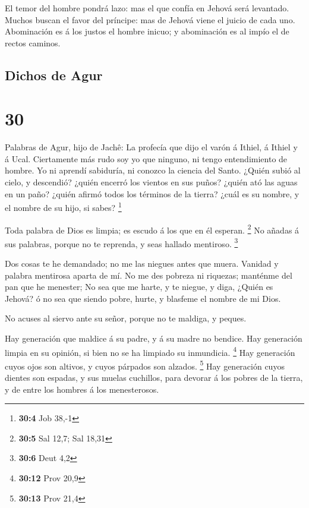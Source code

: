  El temor del hombre pondrá lazo: mas el que confía en
Jehová será levantado.  Muchos buscan el favor del
príncipe: mas de Jehová viene el juicio de cada uno. 
Abominación es á los justos el hombre inicuo; y abominación es al impío
el de rectos caminos.

\hypertarget{dichos-de-agur}{%
\subsection{Dichos de Agur}\label{dichos-de-agur}}

\hypertarget{section-29}{%
\section{30}\label{section-29}}

 Palabras de Agur, hijo de Jachê: La profecía que dijo el
varón á Ithiel, á Ithiel y á Ucal.  Ciertamente más rudo soy
yo que ninguno, ni tengo entendimiento de hombre.  Yo ni
aprendí sabiduría, ni conozco la ciencia del Santo.  ¿Quién
subió al cielo, y descendió? ¿quién encerró los vientos en sus puños?
¿quién ató las aguas en un paño? ¿quién afirmó todos los términos de la
tierra? ¿cuál es su nombre, y el nombre de su hijo, si sabes?
\footnote{\textbf{30:4} Job 38,-1}

 Toda palabra de Dios es limpia; es escudo á los que en él
esperan. \footnote{\textbf{30:5} Sal 12,7; Sal 18,31}  No
añadas á sus palabras, porque no te reprenda, y seas hallado mentiroso.
\footnote{\textbf{30:6} Deut 4,2}

 Dos cosas te he demandado; no me las niegues antes que
muera.  Vanidad y palabra mentirosa aparta de mí. No me des
pobreza ni riquezas; manténme del pan que he menester;  No
sea que me harte, y te niegue, y diga, ¿Quién es Jehová? ó no sea que
siendo pobre, hurte, y blasfeme el nombre de mi Dios.

 No acuses al siervo ante su señor, porque no te maldiga, y
peques.

 Hay generación que maldice á su padre, y á su madre no
bendice.  Hay generación limpia en su opinión, si bien no
se ha limpiado su inmundicia. \footnote{\textbf{30:12} Prov 20,9}
 Hay generación cuyos ojos son altivos, y cuyos párpados
son alzados. \footnote{\textbf{30:13} Prov 21,4}  Hay
generación cuyos dientes son espadas, y sus muelas cuchillos, para
devorar á los pobres de la tierra, y de entre los hombres á los
menesterosos.

